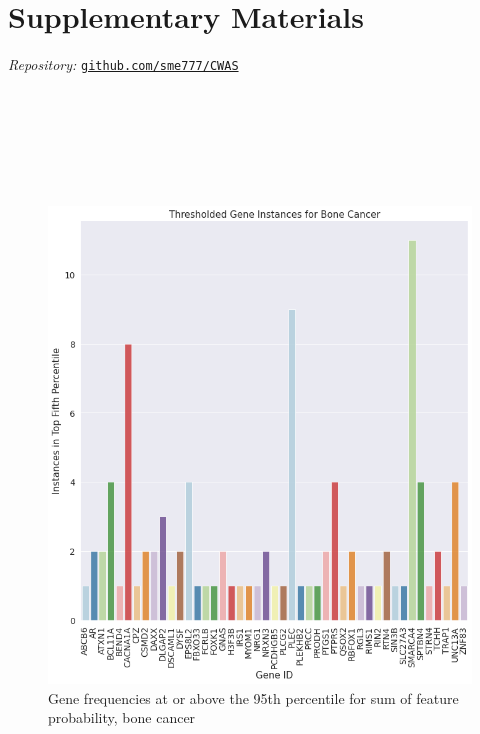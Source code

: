 \documentclass{article}
\begin{document}
\section{Supplementary Materials}
\textit{Repository: } \href{https://github.com/sme777/CWAS}{\texttt{github.com/sme777/CWAS}}
\\\\\\\\\\\\\\
\begin{figure}[h!]
    \centering
    \includegraphics[scale=0.5]{figures/bone.png}
    \caption{Gene frequencies at or above the 95th percentile  for sum of feature probability, bone cancer}
    \label{fig:my_label}
\end{figure}
\end{document}
